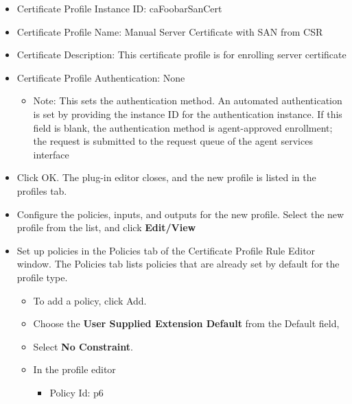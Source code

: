 \documentclass[a4paper]{article}
\begin{document}
\begin{enumerate}[label*=\arabic*.]
\begin{enumerate}[label*=\arabic*.]
                    \begin{itemize}
                        \item Certificate Profile Instance ID: caFoobarSanCert
                        \item Certificate Profile Name: Manual Server Certificate with SAN from CSR
                        \item Certificate Description: This certificate profile is for enrolling server certificate
                        \item Certificate Profile Authentication: None 
                            \begin{itemize}
                                \item Note: This sets the authentication method. An automated authentication is set by providing the 
                                instance ID for the authentication instance. If this field is blank, the authentication method 
                                is agent-approved enrollment; the request is submitted to the request queue of the agent services 
                                interface
                            \end{itemize}
                        \item Click OK. The plug-in editor closes, and the new profile is listed in the profiles tab.
                        \item Configure the policies, inputs, and outputs for the new profile. Select the new profile from the list,
                            and click \textbf{Edit/View}
                        \item Set up policies in the Policies tab of the Certificate Profile Rule Editor window.
                            The Policies tab lists policies that are already set by default for the profile type.
                                \begin{itemize}
                                    \item To add a policy, click Add.
                                    \item Choose the \textbf{User Supplied Extension Default}  from the Default field, 
                                    \item Select \textbf{No Constraint}.
                                    \item In the profile editor 
                                        \begin{itemize}
                                            \item Policy Id: p6

\end{itemize}
\end{itemize}
\end{itemize}
\end{enumerate}
\end{enumerate}
\end{document}
